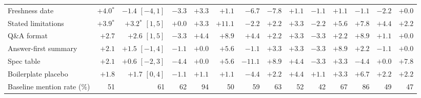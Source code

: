 \begin{tabular}{@{}lrrrrrrrrrrrrr@{}}
Freshness date & $+4.0$$^{*}$ & $-1.4$ {\footnotesize$[-4, 1]$} & $-3.3$ & $+3.3$ & $+1.1$ & $-6.7$ & $-7.8$ & $+1.1$ & $-1.1$ & $+1.1$ & $-1.1$ & $-2.2$ & $+0.0$ \\
Stated limitations & $+3.9$$^{*}$ & $+3.2$$^{*}$ {\footnotesize$[1, 5]$} & $+0.0$ & $+3.3$ & $+11.1$ & $-2.2$ & $+2.2$ & $+3.3$ & $-2.2$ & $+5.6$ & $+7.8$ & $+4.4$ & $+2.2$ \\
Q\&A format & $+2.7$ & $+2.6$ {\footnotesize$[1, 5]$} & $-3.3$ & $+4.4$ & $+8.9$ & $+4.4$ & $+2.2$ & $+3.3$ & $-3.3$ & $+2.2$ & $+8.9$ & $+1.1$ & $+0.0$ \\
Answer-first summary & $+2.1$ & $+1.5$ {\footnotesize$[-1, 4]$} & $-1.1$ & $+0.0$ & $+5.6$ & $-1.1$ & $+3.3$ & $+3.3$ & $-3.3$ & $+8.9$ & $+2.2$ & $-1.1$ & $+0.0$ \\
Spec table & $+2.1$ & $+0.6$ {\footnotesize$[-2, 3]$} & $-4.4$ & $+0.0$ & $+5.6$ & $-11.1$ & $+8.9$ & $+4.4$ & $-3.3$ & $+3.3$ & $-4.4$ & $+0.0$ & $+7.8$ \\
Boilerplate placebo & $+1.8$ & $+1.7$ {\footnotesize$[0, 4]$} & $-1.1$ & $+1.1$ & $+1.1$ & $-4.4$ & $+2.2$ & $+4.4$ & $+1.1$ & $+3.3$ & $+6.7$ & $+2.2$ & $+2.2$ \\
\midrule
Baseline mention rate (\%) & 51 & 61 & 62 & 94 & 50 & 59 & 63 & 52 & 42 & 67 & 86 & 49 & 47 \\
\bottomrule
\end{tabular}
